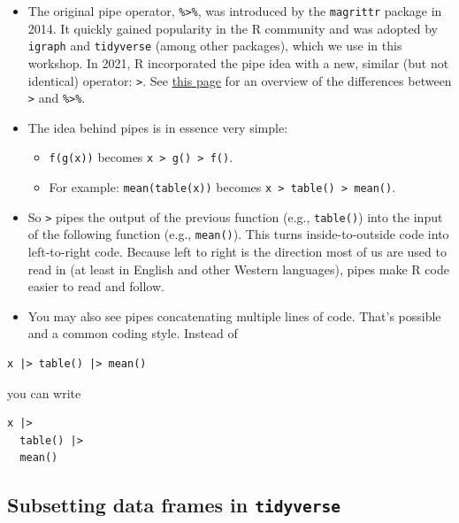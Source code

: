 \documentclass[
]{book}
\providecommand{\tightlist}{%
  \setlength{\itemsep}{0pt}\setlength{\parskip}{0pt}}
\begin{document}
\begin{itemize}
\tightlist
\item
  The original pipe operator, \texttt{\%\textgreater{}\%}, was introduced by the \texttt{magrittr} package in 2014. It quickly gained popularity in the R community and was adopted by \texttt{igraph} and \texttt{tidyverse} (among other packages), which we use in this workshop. In 2021, R incorporated the pipe idea with a new, similar (but not identical) operator: \texttt{\textbar{}\textgreater{}}. See \href{https://www.tidyverse.org/blog/2023/04/base-vs-magrittr-pipe/}{this page} for an overview of the differences between \texttt{\textbar{}\textgreater{}} and \texttt{\%\textgreater{}\%}.
\item
  The idea behind pipes is in essence very simple:

  \begin{itemize}
  \tightlist
  \item
    \texttt{f(g(x))} becomes \texttt{x\ \textbar{}\textgreater{}\ g()\ \textbar{}\textgreater{}\ f()}.
  \item
    For example: \texttt{mean(table(x))} becomes \texttt{x\ \textbar{}\textgreater{}\ table()\ \textbar{}\textgreater{}\ mean()}.
  \end{itemize}
\item
  So \texttt{\textbar{}\textgreater{}} pipes the output of the previous function (e.g., \texttt{table()}) into the input of the following function (e.g., \texttt{mean()}). This turns inside-to-outside code into left-to-right code. Because left to right is the direction most of us are used to read in (at least in English and other Western languages), pipes make R code easier to read and follow.
\item
  You may also see pipes concatenating multiple lines of code. That's possible and a common coding style. Instead of
\end{itemize}

\begin{verbatim}
x |> table() |> mean()
\end{verbatim}

you can write

\begin{verbatim}
x |>
  table() |>
  mean()
\end{verbatim}

\hypertarget{subsetting-data-frames-in-tidyverse}{%
\subsection{\texorpdfstring{Subsetting data frames in \texttt{tidyverse}}{Subsetting data frames in tidyverse}}\label{subsetting-data-frames-in-tidyverse}}
\end{document}
